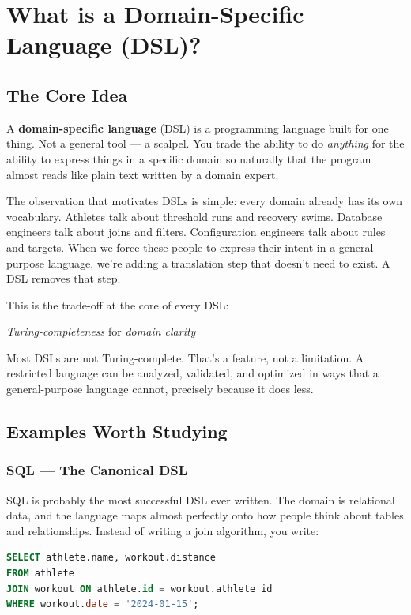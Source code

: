\section{What is a Domain-Specific Language (DSL)?}

\subsection{The Core Idea}

A \textbf{domain-specific language} (DSL) is a programming language built for one thing.
Not a general tool --- a scalpel. You trade the ability to do \emph{anything} for the
ability to express things in a specific domain so naturally that the program almost reads
like plain text written by a domain expert.

The observation that motivates DSLs is simple: every domain already has its own vocabulary.
Athletes talk about threshold runs and recovery swims. Database engineers talk about joins
and filters. Configuration engineers talk about rules and targets. When we force these people
to express their intent in a general-purpose language, we're adding a translation step that
doesn't need to exist. A DSL removes that step.

This is the trade-off at the core of every DSL:
\begin{center}
\textit{Turing-completeness} \quad for \quad \textit{domain clarity}
\end{center}

Most DSLs are not Turing-complete. That's a feature, not a limitation. A restricted
language can be analyzed, validated, and optimized in ways that a general-purpose language
cannot, precisely because it does less.

\subsection{Examples Worth Studying}

\subsubsection{SQL --- The Canonical DSL}

SQL is probably the most successful DSL ever written. The domain is relational data, and
the language maps almost perfectly onto how people think about tables and relationships.
Instead of writing a join algorithm, you write:

\begin{lstlisting}[language=SQL]
SELECT athlete.name, workout.distance
FROM athlete
JOIN workout ON athlete.id = workout.athlete_id
WHERE workout.date = '2024-01-15';
\end{lstlisting}

